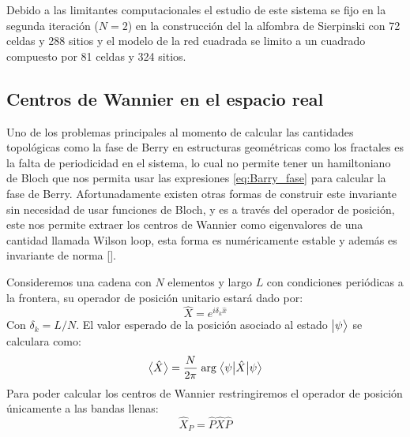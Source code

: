 Debido a las limitantes computacionales el estudio de este sistema se fijo en la segunda  iteración ($N=2$) en la construcción del la alfombra de Sierpinski con 72 celdas y 288 sitios y el modelo de la red cuadrada se limito a un cuadrado compuesto por 81 celdas y 324 sitios. 

\subsection{Centros de Wannier en el espacio real}

Uno de los problemas principales al momento de calcular las cantidades topológicas como la fase de Berry en estructuras geométricas como los fractales es la falta de periodicidad en el sistema, lo cual no permite tener un hamiltoniano de Bloch que nos permita usar las expresiones \ref{eq:Barry_fase} para calcular la fase de Berry. Afortunadamente existen otras formas de construir este invariante sin necesidad de usar funciones de Bloch, y es a través del operador de posición, este nos permite extraer los centros de Wannier como eigenvalores de una cantidad llamada Wilson loop, esta forma es numéricamente estable y además es invariante de norma [\cite{Asboth2015}].

Consideremos una cadena con $N$ elementos y largo $L$ con condiciones periódicas a la frontera, su operador de posición unitario estará dado por:
\begin{equation}
    \hat{X} = e^{i\delta_k \hat{x}}
\end{equation}
Con $\delta_k = L/N$. El valor esperado de la posición asociado al estado $\big |{\psi}\big \rangle$ se calculara como:
\begin{equation}
    \big \langle{\hat{X}} \big \rangle = \frac{N}{2\pi} \; \text{arg} \; \big \langle{\psi}\big | {\hat{X}} \big | {\psi} \big \rangle
\end{equation}
Para poder calcular los centros de Wannier restringiremos el operador de posición únicamente a las bandas llenas:
\begin{equation}
    \hat{X}_P = \hat{P} \hat{X} \hat{P}
\end{equation}

